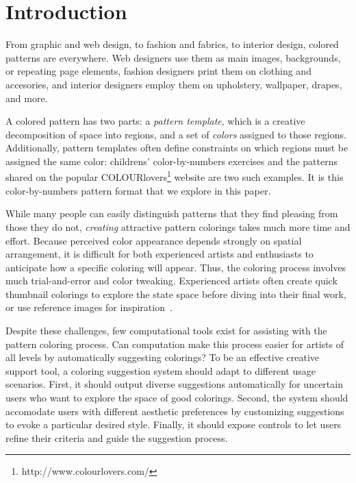 \section{Introduction}
\label{sec:introduction}

From graphic and web design, to fashion and fabrics, to interior design, colored patterns are everywhere. Web designers use them as main images, backgrounds, or repeating page elements, fashion designers print them on clothing and accesories, and interior designers employ them on upholstery, wallpaper, drapes, and more.

A colored pattern has two parts: a \emph{pattern template}, which is a creative decomposition of space into regions, and a set of \emph{colors} assigned to those regions.
Additionally, pattern templates often define constraints on which regions must be assigned the same color: childrens' color-by-numbers exercises and the patterns shared on the popular COLOURlovers\footnote{http://www.colourlovers.com/} website are two such examples. It is this color-by-numbers pattern format that we explore in this paper.

While many people can easily distinguish patterns that they find pleasing from those they do not, \emph{creating} attractive pattern colorings takes much more time and effort. Because perceived color appearance depends strongly on spatial arrangement, it is difficult for both experienced artists and enthusiasts to anticipate how a specific coloring will appear. Thus, the coloring process involves much trial-and-error and color tweaking. Experienced artists often create quick thumbnail colorings to explore the state space before diving into their final work, or use reference images for inspiration~\cite{ColorPaletteTools}.

Despite these challenges, few computational tools exist for assisting with the pattern coloring process. Can computation make this process easier for artists of all levels by automatically suggesting colorings? To be an effective creative support tool, a coloring suggestion system should adapt to different usage scenarios. First, it should output diverse suggestions automatically for uncertain users who want to explore the space of good colorings. Second, the system should accomodate users with different aesthetic preferences by customizing suggestions to evoke a particular desired style. Finally, it should expose controls to let users refine their criteria and guide the suggestion process. 

